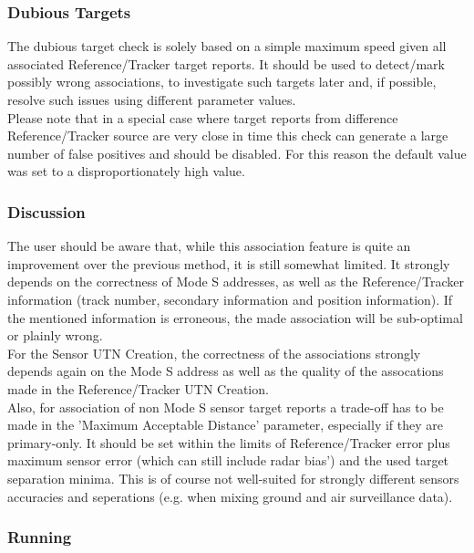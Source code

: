 \subsubsection{Dubious Targets}

The dubious target check is solely based on a simple maximum speed given all associated Reference/Tracker target reports. It should be used to detect/mark possibly wrong associations, to investigate such targets later and, if possible, resolve such issues using different parameter values. \\

Please note that in a special case where target reports from difference Reference/Tracker source are very close in time this check can generate a large number of false positives and should be disabled. For this reason the default value was set to a disproportionately high value.

\subsubsection{Discussion}

The user should be aware that, while this association feature is quite an improvement over the previous method, it is still somewhat limited. It strongly depends on the correctness of Mode S addresses, as well as the Reference/Tracker information (track number, secondary information and position information). If the mentioned information is erroneous, the made association will be sub-optimal or plainly wrong. \\

For the Sensor UTN Creation, the correctness of the associations strongly depends again on the Mode S address as well as the quality of the assocations made in the Reference/Tracker UTN Creation. \\

Also, for association of non Mode S sensor target reports a trade-off has to be made in the 'Maximum Acceptable Distance' parameter, especially if they are primary-only. It should be set within the limits of Reference/Tracker error plus maximum sensor error (which can still include radar bias') and the used target separation minima. This is of course not well-suited for strongly different sensors accuracies and seperations (e.g. when mixing ground and air surveillance data). \\

\subsubsection{Running}

